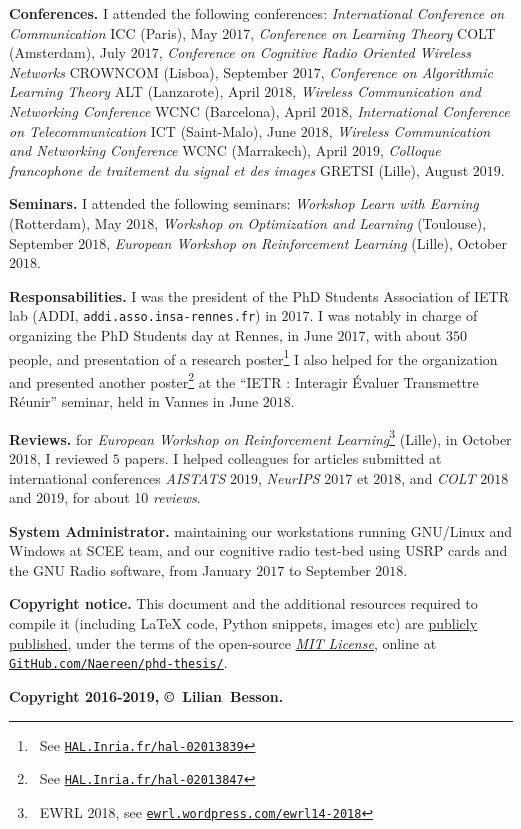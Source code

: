 \textbf{Conferences.}
    I attended the following conferences:
	\emph{International Conference on Communication} ICC (Paris), May $2017$,
    \emph{Conference on Learning Theory} COLT (Amsterdam), July $2017$,
    \emph{Conference on Cognitive Radio Oriented Wireless Networks} CROWNCOM (Lisboa), September $2017$,
    \emph{Conference on Algorithmic Learning Theory} ALT (Lanzarote), April $2018$,
    \emph{Wireless Communication and Networking Conference} WCNC (Barcelona), April $2018$,
	\emph{International Conference on Telecommunication} ICT (Saint-Malo), June $2018$,
    \emph{Wireless Communication and Networking Conference} WCNC (Marrakech), April $2019$,
    \emph{Colloque francophone de traitement du signal et des images} GRETSI (Lille), August $2019$.

\textbf{Seminars.}
    I attended the following seminars:
	\emph{Workshop Learn with Earning} (Rotterdam), May $2018$,
	\emph{Workshop on Optimization and Learning} (Toulouse), September $2018$,
	\emph{European Workshop on Reinforcement Learning} (Lille), October $2018$.

\textbf{Responsabilities.}
    I was the president of the PhD Students Association of IETR lab (ADDI, \texttt{addi.asso.insa-rennes.fr}) in $2017$.
    I was notably in charge of organizing the PhD Students day at Rennes, in June $2017$, with about $350$ people, and presentation of a research poster\footnote{~See \href{https://HAL.Inria.fr/hal-02013839}{\texttt{HAL.Inria.fr/hal-02013839}}}
    I also helped for the organization and presented another poster\footnote{~See \href{https://HAL.Inria.fr/hal-02013847}{\texttt{HAL.Inria.fr/hal-02013847}}} at the ``IETR : Interagir Évaluer Transmettre Réunir'' seminar, held in Vannes in June $2018$.

\textbf{Reviews.}
	for \emph{European Workshop on Reinforcement Learning}\footnote{~EWRL 2018, see \href{https://ewrl.wordpress.com/ewrl14-2018}{\texttt{ewrl.wordpress.com/ewrl14-2018}}} (Lille), in October $2018$, I reviewed $5$ papers.
	I helped colleagues for articles submitted at international conferences \emph{AISTATS} $2019$, \emph{NeurIPS} $2017$ et $2018$, and \emph{COLT} $2018$ and $2019$, for about 10 \emph{reviews}.

\textbf{System Administrator.}
	maintaining our workstations running GNU/Linux and Windows
	at SCEE team,
	and our cognitive radio test-bed using USRP cards and the GNU Radio software,
	from January $2017$ to September $2018$.

\vfill{}

\textbf{Copyright notice.}
%
This document and the additional resources required to compile it (including \LaTeX{} code, Python snippets, images etc)
are \href{https://github.com/Naereen/phd-thesis/}{publicly published},
under the terms of the open-source \href{https://lbesson.mit-license.org/}{\emph{MIT License}},
online at \href{https://github.com/Naereen/phd-thesis/}{\texttt{GitHub.com/Naereen/phd-thesis/}}.


\begin{center}
    \textbf{Copyright 2016-2019, \copyright ~Lilian~Besson.}
\end{center}
